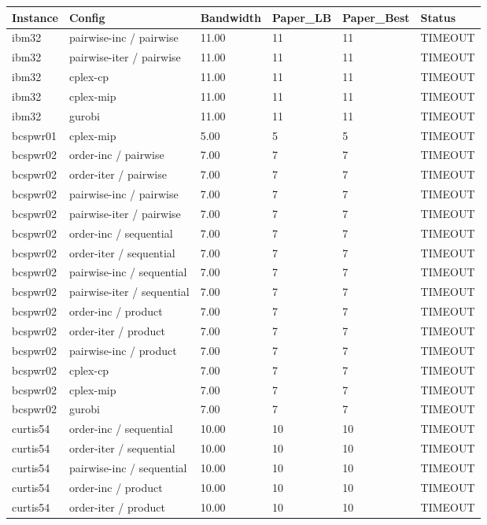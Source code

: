 \begin{tabular}{llllll}
\hline
Instance & Config & Bandwidth & Paper\_LB & Paper\_Best & Status \\
\hline
ibm32 & pairwise-inc / pairwise & 11.00 & 11 & 11 & TIMEOUT \\
ibm32 & pairwise-iter / pairwise & 11.00 & 11 & 11 & TIMEOUT \\
ibm32 & cplex-cp & 11.00 & 11 & 11 & TIMEOUT \\
ibm32 & cplex-mip & 11.00 & 11 & 11 & TIMEOUT \\
ibm32 & gurobi & 11.00 & 11 & 11 & TIMEOUT \\
bcspwr01 & cplex-mip & 5.00 & 5 & 5 & TIMEOUT \\
bcspwr02 & order-inc / pairwise & 7.00 & 7 & 7 & TIMEOUT \\
bcspwr02 & order-iter / pairwise & 7.00 & 7 & 7 & TIMEOUT \\
bcspwr02 & pairwise-inc / pairwise & 7.00 & 7 & 7 & TIMEOUT \\
bcspwr02 & pairwise-iter / pairwise & 7.00 & 7 & 7 & TIMEOUT \\
bcspwr02 & order-inc / sequential & 7.00 & 7 & 7 & TIMEOUT \\
bcspwr02 & order-iter / sequential & 7.00 & 7 & 7 & TIMEOUT \\
bcspwr02 & pairwise-inc / sequential & 7.00 & 7 & 7 & TIMEOUT \\
bcspwr02 & pairwise-iter / sequential & 7.00 & 7 & 7 & TIMEOUT \\
bcspwr02 & order-inc / product & 7.00 & 7 & 7 & TIMEOUT \\
bcspwr02 & order-iter / product & 7.00 & 7 & 7 & TIMEOUT \\
bcspwr02 & pairwise-inc / product & 7.00 & 7 & 7 & TIMEOUT \\
bcspwr02 & cplex-cp & 7.00 & 7 & 7 & TIMEOUT \\
bcspwr02 & cplex-mip & 7.00 & 7 & 7 & TIMEOUT \\
bcspwr02 & gurobi & 7.00 & 7 & 7 & TIMEOUT \\
curtis54 & order-inc / sequential & 10.00 & 10 & 10 & TIMEOUT \\
curtis54 & order-iter / sequential & 10.00 & 10 & 10 & TIMEOUT \\
curtis54 & pairwise-inc / sequential & 10.00 & 10 & 10 & TIMEOUT \\
curtis54 & order-inc / product & 10.00 & 10 & 10 & TIMEOUT \\
curtis54 & order-iter / product & 10.00 & 10 & 10 & TIMEOUT \\

\end{tabular}
